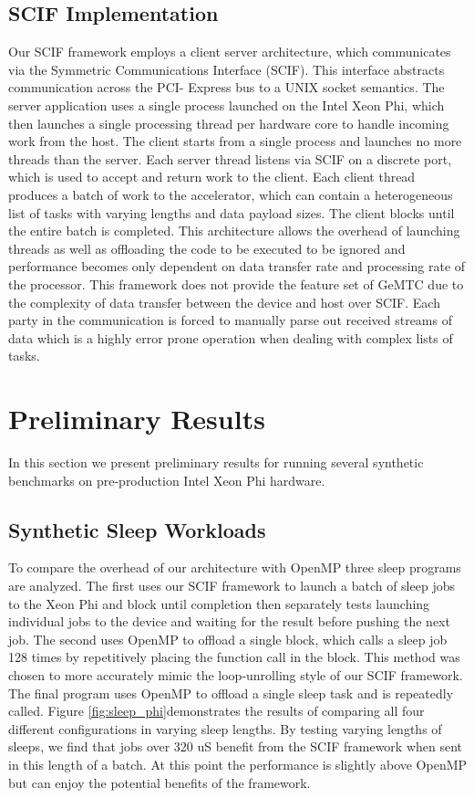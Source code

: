 \documentclass[conference]{IEEEtran}
\begin{document}
\subsection{SCIF Implementation}
Our SCIF framework employs a client server architecture, which communicates via the Symmetric Communications Interface (SCIF). This interface abstracts communication across the PCI- Express bus to a UNIX socket semantics. The server application uses a single process launched on the Intel Xeon Phi, which then launches a single processing thread per hardware core to handle incoming work from the host. The client starts from a single process and launches no more threads than the server. Each server thread listens via SCIF on a discrete port, which is used to accept and return work to the client. Each client thread produces a batch of work to the accelerator, which can contain a heterogeneous list of tasks with varying lengths and data payload sizes. The client blocks until the entire batch is completed. This architecture allows the overhead of launching threads as well as offloading the code to be executed to be ignored and performance becomes only dependent on data transfer rate and processing rate of the processor. This framework does not provide the feature set of GeMTC due to the complexity of data transfer between the device and host over SCIF. Each party in the communication is forced to manually parse out received streams of data which is a highly error prone operation when dealing with complex lists of tasks.

\section{Preliminary Results}
In this section we present preliminary results for running several synthetic benchmarks on pre-production Intel Xeon Phi hardware.

\subsection{Synthetic Sleep Workloads}
To compare the overhead of our architecture with OpenMP three sleep programs are analyzed. The first uses our SCIF framework to launch a batch of sleep jobs to the Xeon Phi and block until completion then separately tests launching individual jobs to the device and waiting for the result before pushing the next job. The second uses OpenMP to offload a single block, which calls a sleep job 128 times by repetitively placing the function call in the block. This method was chosen to more accurately mimic the loop-unrolling style of our SCIF framework. The final program uses OpenMP to offload a single sleep task and is repeatedly called. Figure \ref{fig:sleep_phi}demonstrates the results of comparing all four different configurations in varying sleep lengths. By testing varying lengths of sleeps, we find that jobs over 320 uS benefit from the SCIF framework when sent in this length of a batch. At this point the performance is slightly above OpenMP but can enjoy the potential benefits of the framework.
\end{document}
